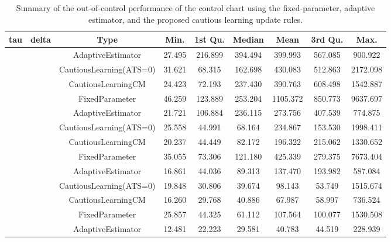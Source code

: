 \begin{table}[!h]

\caption{Summary of the out-of-control performance of the control chart using the fixed-parameter, adaptive estimator, and the proposed cautious learning update rules.}
\centering
\begin{tabular}[t]{ccccccccc}
\toprule
tau & delta & Type & Min. & 1st Qu. & Median & Mean & 3rd Qu. & Max.\\
\midrule
 &  & AdaptiveEstimator & 27.495 & 216.899 & 394.494 & 399.993 & 567.085 & 900.922\\

 &  & CautiousLearning(ATS=0) & 31.621 & 68.315 & 162.698 & 430.083 & 512.863 & 2172.098\\

 &  & CautiousLearningCM & 24.423 & 72.193 & 237.430 & 390.763 & 608.498 & 1542.887\\

 & \multirow[t]{-4}{*}{\centering\arraybackslash 0.25} & FixedParameter & 46.259 & 123.889 & 253.204 & 1105.372 & 850.773 & 9637.697\\
\cmidrule{2-9}
 &  & AdaptiveEstimator & 21.721 & 106.884 & 236.115 & 273.756 & 407.539 & 774.875\\

 &  & CautiousLearning(ATS=0) & 25.558 & 44.991 & 68.164 & 234.867 & 153.530 & 1998.411\\

 &  & CautiousLearningCM & 20.237 & 44.449 & 82.172 & 196.322 & 215.062 & 1330.652\\

 & \multirow[t]{-4}{*}{\centering\arraybackslash 0.35} & FixedParameter & 35.055 & 73.306 & 121.180 & 425.339 & 279.375 & 7673.404\\
\cmidrule{2-9}
 &  & AdaptiveEstimator & 16.861 & 44.036 & 89.313 & 137.470 & 193.982 & 587.084\\

 &  & CautiousLearning(ATS=0) & 19.848 & 30.806 & 39.674 & 98.143 & 53.749 & 1515.674\\

 &  & CautiousLearningCM & 16.260 & 29.768 & 40.886 & 67.987 & 58.997 & 736.524\\

 & \multirow[t]{-4}{*}{\centering\arraybackslash 0.50} & FixedParameter & 25.857 & 44.325 & 61.112 & 107.564 & 100.077 & 1530.508\\
\cmidrule{2-9}
 &  & AdaptiveEstimator & 12.481 & 22.223 & 29.581 & 40.783 & 44.519 & 228.939\\


\end{tabular}
\end{table}
